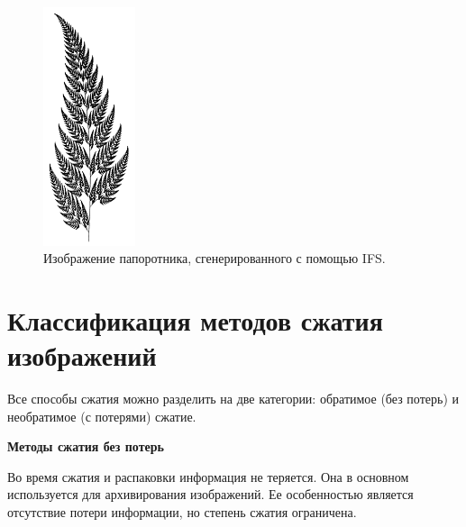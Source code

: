      \begin{figure}[h!]
    	\centering
    	\includegraphics[width=\textwidth,height=7cm,keepaspectratio]{pap.png}
    	\caption{Изображение папоротника, сгенерированного с помощью IFS.} \label{fig:pap}
    \end{figure}
    
\newpage    
    
    \section{Классификация методов сжатия изображений}
    
    
    Все способы сжатия можно разделить на две категории: обратимое (без потерь) и необратимое (с потерями) сжатие.
    
    \textbf{Методы сжатия без потерь}
    
    Во время сжатия и распаковки информация не теряется. Она в основном используется для архивирования изображений. Ее особенностью является отсутствие потери информации, но степень сжатия ограничена.
    
